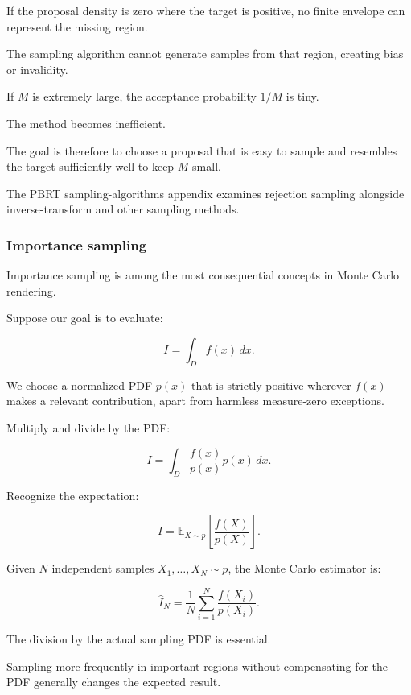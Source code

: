 \hypertarget{02-foundations-ii-ch029-when-rejection-sampling-is-invalid-or-inefficient}{}

If the proposal density is zero where the target is positive, no finite envelope can represent the missing region.

The sampling algorithm cannot generate samples from that region, creating bias or invalidity.

If \(M\) is extremely large, the acceptance probability \(1/M\) is tiny.

The method becomes inefficient.

The goal is therefore to choose a proposal that is easy to sample and resembles the target sufficiently well to keep \(M\) small.

The PBRT sampling-algorithms appendix examines rejection sampling alongside inverse-transform and other sampling methods.

\subsubsection{Importance sampling}\label{02-foundations-ii-ch029-importance-sampling}

\hypertarget{02-foundations-ii-ch029-importance-sampling}{}

Importance sampling is among the most consequential concepts in Monte Carlo rendering.

Suppose our goal is to evaluate:

\[
 \boxed{ I=\int_Df(x)\,dx }.
\]

We choose a normalized PDF \(p(x)\) that is strictly positive wherever \(f(x)\) makes a relevant contribution, apart from harmless measure-zero exceptions.

Multiply and divide by the PDF:

\[
 I= \int_D \frac{f(x)}{p(x)}p(x)\,dx.
\]

Recognize the expectation:

\[
 \boxed{ I= \mathbb E_{X\sim p} \left[ \frac{f(X)}{p(X)} \right] }.
\]

Given \(N\) independent samples \(X_1,\ldots,X_N\sim p\), the Monte Carlo estimator is:

\[
 \boxed{ \widehat I_N= \frac1N\sum_{i=1}^{N} \frac{f(X_i)}{p(X_i)} }.
\]

The division by the actual sampling PDF is essential.

Sampling more frequently in important regions without compensating for the PDF generally changes the expected result.

